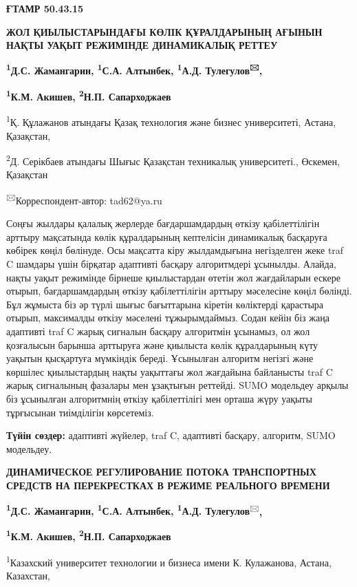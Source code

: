 \newpage
{\bfseries ҒТАМР 50.43.15}

{\bfseries ЖОЛ ҚИЫЛЫСТАРЫНДАҒЫ КӨЛІК ҚҰРАЛДАРЫНЫҢ АҒЫНЫН НАҚТЫ УАҚЫТ
РЕЖИМІНДЕ ДИНАМИКАЛЫҚ РЕТТЕУ}

{\bfseries \textsuperscript{1}Д.С. Жамангарин, \textsuperscript{1}С.А.
Алтынбек, \textsuperscript{1}А.Д. Тулегулов\textsuperscript{🖂},}

{\bfseries \textsuperscript{1}К.М. Акишев, \textsuperscript{2}Н.П.
Сапарходжаев}

\textsuperscript{1}Қ. Құлажанов атындағы Қазақ технология және бизнес
университеті, Астана, Қазақстан,

\textsuperscript{2}Д. Серікбаев атындағы Шығыс Қазақстан техникалық
университеті., Өскемен, Қазақстан

\textsuperscript{🖂}Корреспондент-автор: tad62@ya.ru

Соңғы жылдары қалалық жерлерде бағдаршамдардың өткізу қабілеттілігін
арттыру мақсатында көлік құралдарының кептелісін динамикалық басқаруға
көбірек көңіл бөлінуде. Осы мақсатта кіру жылдамдығына негізделген жеке
traf C шамдары үшін бірқатар адаптивті басқару алгоритмдері ұсынылды.
Алайда, нақты уақыт режимінде бірнеше қиылыстардан өтетін жол
жағдайларын ескере отырып, бағдаршамдардың өткізу қабілеттілігін арттыру
мәселесіне көңіл бөлінді. Бұл жұмыста біз әр түрлі шығыс бағыттарына
кіретін көліктерді қарастыра отырып, максималды өткізу мәселені
тұжырымдаймыз. Содан кейін біз жаңа адаптивті traf C жарық сигналын
басқару алгоритмін ұсынамыз, ол жол қозғалысын барынша арттыруға және
қиылыста көлік құралдарының күту уақытын қысқартуға мүмкіндік береді.
Ұсынылған алгоритм негізгі және көршілес қиылыстардың нақты уақыттағы
жол жағдайына байланысты traf C жарық сигналының фазалары мен ұзақтығын
реттейді. SUMO модельдеу арқылы біз ұсынылған алгоритмнің өткізу
қабілеттілігі мен орташа жүру уақыты тұрғысынан тиімділігін көрсетеміз.

{\bfseries Түйін сөздер:} адаптивті жүйелер, traf C, адаптивті басқару,
алгоритм, SUMO модельдеу.

{\bfseries ДИНАМИЧЕСКОЕ РЕГУЛИРОВАНИЕ ПОТОКА ТРАНСПОРТНЫХ СРЕДСТВ НА
ПЕРЕКРЕСТКАХ В РЕЖИМЕ РЕАЛЬНОГО ВРЕМЕНИ}

{\bfseries \textsuperscript{1}Д.С. Жамангарин, \textsuperscript{1}С.А.
Алтынбек, \textsuperscript{1}А.Д.
Тулегулов}\textsuperscript{🖂}{\bfseries ,}

{\bfseries \textsuperscript{1}К.М. Акишев, \textsuperscript{2}Н.П.
Сапарходжаев}

\textsuperscript{1}Казахский университет технологии и бизнеса имени К.
Кулажанова, Астана, Казахстан,

